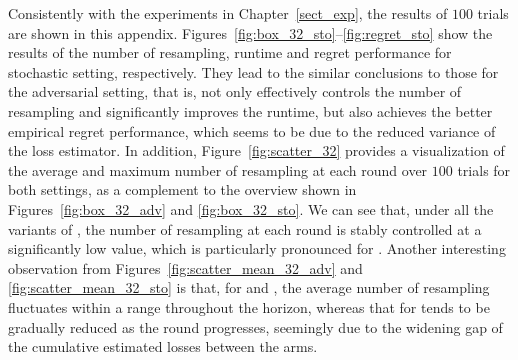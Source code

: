 
Consistently with the experiments in Chapter~\ref{sect_exp}, the results of $100$ trials are shown in this appendix.
Figures~\ref{fig:box_32_sto}--\ref{fig:regret_sto} 
show the results of the number of resampling, runtime and regret performance for stochastic setting, respectively.
They lead to the similar conclusions to those for the adversarial setting, that is, {} not only effectively controls the number of resampling and significantly improves the runtime, but also achieves the better empirical regret performance, which seems to be due to the reduced variance of the loss estimator.
In addition, Figure~\ref{fig:scatter_32} provides a visualization of the average and maximum number of resampling at each round over $100$ trials for both settings, as a complement to the overview shown in Figures~\ref{fig:box_32_adv} and \ref{fig:box_32_sto}.
We can see that, under all the variants of {}, the number of resampling at each round is stably controlled at a significantly low value, which is particularly pronounced for {}.
Another interesting observation from Figures~\ref{fig:scatter_mean_32_adv} and \ref{fig:scatter_mean_32_sto} is that, for {} and {}, the average number of resampling fluctuates within a range throughout the horizon, whereas that for {} tends to be gradually reduced as the round progresses, seemingly due to the widening gap of the cumulative estimated losses between the arms.


